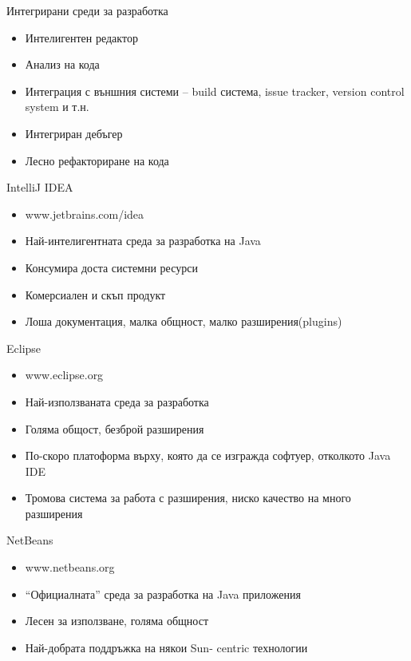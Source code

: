 \documentclass{beamer}
\begin{document}
\begin{frame}{Интегрирани среди за разработка}
  \transdissolve  
  \begin{itemize}
    \item Интелигентен редактор
    \item Анализ на кода
    \item Интеграция с външния системи – build
    система, issue tracker, version control
    system и т.н.
    \item Интегриран дебъгер
    \item Лесно рефакториране на кода
  \end{itemize}
\end{frame}

\begin{frame}{IntelliJ IDEA}
  \transdissolve
  \begin{itemize}
    \item www.jetbrains.com/idea
    \item Най-интелигентната среда за
    разработка на Java
    \item Консумира доста системни ресурси
    \item Комерсиален и скъп продукт
    \item Лоша документация, малка общност,
    малко разширения(plugins)
  \end{itemize}
\end{frame}

\begin{frame}{Eclipse}
  \transdissolve
  \begin{itemize}
    \item www.eclipse.org
    \item Най-използваната среда за разработка
    \item Голяма общост, безброй разширения
    \item По-скоро платоформа върху, която да се
    изгражда софтуер, отколкото Java IDE
    \item Тромова система за работа с
    разширения, ниско качество на много
    разширения
  \end{itemize}
\end{frame}

\begin{frame}{NetBeans}
  \transdissolve  
  \begin{itemize}
    \item www.netbeans.org
    \item “Официалната” среда за разработка на
    Java приложения
    \item Лесен за използване, голяма общност
    \item Най-добрата поддръжка на някои Sun-
    centric технологии
  \end{itemize}
\end{frame}
\end{document}
